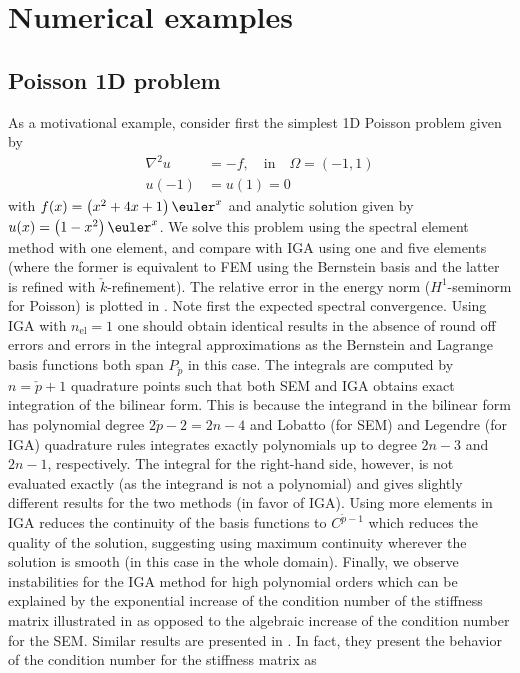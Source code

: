 \section{Numerical examples}
\subsection{Poisson 1D problem}
As a motivational example, consider first the simplest 1D Poisson problem given by
\begin{align*}
	\nabla^2 u &= -f,\quad\text{in}\quad \Omega=(-1,1)\\
	u(-1) &= u(1) = 0
\end{align*}
with $f(x)=\left(x^2+4x+1\right)\euler^x$ and analytic solution given by $u(x) = \left(1-x^2\right)\euler^x$. We solve this problem using the spectral element method with one element, and compare with IGA using one and five elements (where the former is equivalent to FEM using the Bernstein basis and the latter is refined with $\check{k}$-refinement). The relative error in the energy norm ($H^1$-seminorm for Poisson) is plotted in . Note first the expected spectral convergence. Using IGA with $n_{\mathrm{el}}=1$ one should obtain identical results in the absence of round off errors and errors in the integral approximations as the Bernstein and Lagrange basis functions both span $P_{\check{p}}$ in this case. The integrals are computed by $n=\check{p}+1$ quadrature points such that both SEM and IGA obtains exact integration of the bilinear form. This is because the integrand in the bilinear form has polynomial degree $2\check{p}-2=2n-4$ and Lobatto (for SEM) and Legendre (for IGA) quadrature rules integrates exactly polynomials up to degree $2n-3$ and $2n-1$, respectively. The integral for the right-hand side, however, is not evaluated exactly (as the integrand is not a polynomial) and gives slightly different results for the two methods (in favor of IGA). Using more elements in IGA reduces the continuity of the basis functions to $C^{\check{p}-1}$ which reduces the quality of the solution, suggesting using maximum continuity wherever the solution is smooth (in this case in the whole domain). Finally, we observe instabilities for the IGA method for high polynomial orders which can be explained by the exponential increase of the condition number of the stiffness matrix illustrated in  as opposed to the algebraic increase of the condition number for the SEM. Similar results are presented in \cite{Gervasio2018cia}. In fact, they present the behavior of the condition number for the stiffness matrix as
